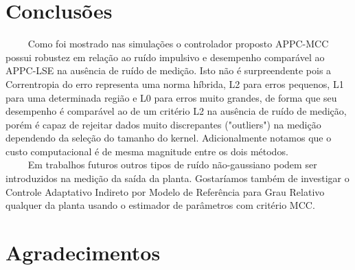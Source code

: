 \documentclass[conference,harvard,brazil,english]{sbatex}
\begin{document}
\pagebreak
\section{Conclusões}
~~~~       Como foi mostrado nas simulações o controlador proposto APPC-MCC possui robustez em relação ao ruído impulsivo e desempenho comparável ao APPC-LSE na ausência de ruído de medição. Isto não é surpreendente pois a Correntropia do erro representa uma norma híbrida, L2 para erros pequenos, L1 para uma determinada região e L0 para erros muito grandes, de forma que seu desempenho é comparável ao de um critério L2 na ausência de ruído de medição, porém é capaz de rejeitar dados muito discrepantes ("outliers") na medição dependendo da seleção do tamanho do kernel. Adicionalmente notamos que o custo computacional é de mesma magnitude entre os dois métodos.\\


~~~~       Em trabalhos futuros outros tipos de ruído não-gaussiano podem ser introduzidos na medição da saída da
planta. Gostaríamos também de investigar o Controle Adaptativo Indireto por Modelo de Referência para Grau Relativo qualquer da planta usando o estimador de parâmetros com critério MCC.\\


\section*{Agradecimentos}



\end{document}
